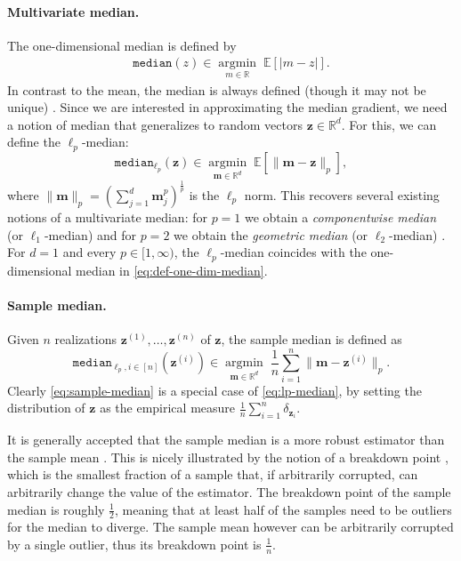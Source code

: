 \documentclass[10pt]{article} %
\renewcommand{\vec}[1]{\bm{#1}}
\DeclareMathOperator{\argmininn}{argmin}
\newcommand{\argmin}[1]{ \underset{#1}{\argmininn} \;}
\newcommand{\R}{\mathbb{R}}
\newcommand{\E}[1]{\mathbb{E}\left[#1\right] }
\newcommand{\norm}[1]{ \|#1 \|}
\newcommand{\median}{\texttt{median}}
\newcommand{\samplemedian}[1]{\texttt{median}_{#1,i\in[n]}}
\begin{document}
\paragraph{Multivariate median.} The one-dimensional median is defined by
\begin{align}\label{eq:def-one-dim-median}
    \median{}(z) \in 
    \argmin{m \in \mathbb{R}} \E{|m-z|}.
\end{align}
In contrast to the mean, the median is always defined (though it may not be unique) \citep{Cramer2016}.
Since we are interested in approximating the median gradient, 
we need a notion of median that generalizes to random vectors $\vec{z}\in \R^d$. For this, we can define the $\ell_p$-median: \begin{equation}\label{eq:lp-median}
    \median_{\ell_p}(\vec{z}) \in \argmin{\vec{m} \in \R^d} \E{ \norm{\vec{m} - \vec{z}}_p},
\end{equation}
where $\|\vec{m}\|_p =\left( \sum_{j=1}^d \vec{m}_j^p \right)^{\frac{1}{p}}$ is the $\ell_p$ norm.
This recovers several existing notions of a multivariate median: for $p=1$ we obtain a \emph{componentwise median} (or $\ell_1$-median) and for $p=2$ we obtain the \emph{geometric median} (or $\ell_2$-median)  \citep{Frechet1948,Weiszfeld2009,Minsker2015,Cohen2016}. For $d=1$ and every $p \in [1, \infty)$, the $\ell_p$-median coincides with the one-dimensional median in \eqref{eq:def-one-dim-median}.

\paragraph{Sample median.} Given $n$ realizations $\vec{z}^{(1)},\ldots,\vec{z}^{(n)}$ of $\vec{z}$, the sample median is defined as 
\begin{equation}\label{eq:sample-median}
    \samplemedian{\ell_p}(\vec{z}^{(i)}) \in \argmin{\vec{m} \in \R^d} \frac{1}{n}\sum_{i=1}^n \norm{\vec{m} - \vec{z}^{(i)}}_p.
\end{equation}
Clearly \eqref{eq:sample-median} is a special case of \eqref{eq:lp-median}, by setting the distribution of $\vec{z}$ as the empirical measure $\frac{1}{n}\sum_{i=1}^n \delta_{\vec{z}_i}$.

It is generally accepted that the sample median is a more robust estimator than the sample mean \citep{Huber1981,Hampel2005}.
This is nicely illustrated by the notion of a breakdown point \citep{Donoho1983,Lopuhaa1991},  which is the smallest fraction of a sample that, if arbitrarily corrupted, can arbitrarily change the value of the estimator. The breakdown point of the sample median is roughly $\tfrac12$, meaning that at least half of the samples need to be outliers for the median to diverge. The sample mean however can be arbitrarily corrupted by a single outlier, thus its breakdown point is $\tfrac{1}{n}$. 
\end{document}
